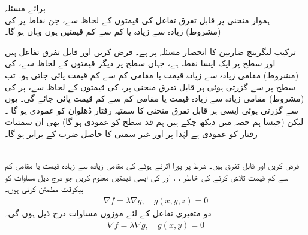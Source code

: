 برائے مسئلہ \\
ہموار منحنی   پر   قابل تفرق تفاعل  کی قیمتوں کے لحاظ سے،   جن نقاط پر    کی (مشروط)  زیادہ سے زیادہ یا کم سے کم قیمتیں ہوں وہاں  ہو گا۔

ترکیب لیگرینج  ضاربین کا انحصار مسئلہ   پر ہے۔  فرض کریں  اور  قابل تفرق تفاعل  ہیں اور  سطح  پر  ایک ایسا نقطہ ہے،   جہاں  سطح پر دیگر قیمتوں کے لحاظ سے،   کی (مشروط) مقامی زیادہ سے زیادہ قیمت یا مقامی کم سے کم قیمت پائی جاتی ہو۔ تب  سطح  پر  سے  گزرتی ہوئی  ہر قابل تفرق منحنی پر،    کی قیمتوں کے لحاظ  سے،   پر  کی (مشروط)   مقامی زیادہ سے زیادہ قیمت یا مقامی کم سے کم قیمت پائی جائے گی۔ یوں  سے گزرتی ہوئی ایسی ہر قابل تفرق  منحنی کا  سمتیہ رفتار  ڈھلوان    کو عمودی ہو گا  ۔ لیکن   (جیسا ہم حصہ  میں دیکھ چکے ہیں   ہم قد سطح  کو عمودی ہو گا) بھی ان سمتیات  رفتار کو عمودی ہے لہٰذا  پر  اور غیر سمتی   کا حاصل ضرب  کے برابر ہو گا۔ 

\\
فرض کریں  اور  قابل تفرق ہیں۔ شرط   پر پورا اترتے ہوئے  کی مقامی زیادہ سے زیادہ قیمت یا  مقامی کم سے کم قیمت تلاش کرنے کی خاطر  ، ،  اور  کی ایسی قیمتیں معلوم کریں جو درج ذیل مساوات کو  بیکوقت مطمئن کرتی  ہوں۔ 
\begin{align*}
\nabla f=\lambda \nabla g,\quad g(x,y,z)=0
\end{align*}
دو متغیری تفاعل  کے لئے موزوں مساوات درج ذیل ہوں گی۔
\begin{align*}
\nabla f=\lambda \nabla g,\quad g(x,y)=0
\end{align*}


